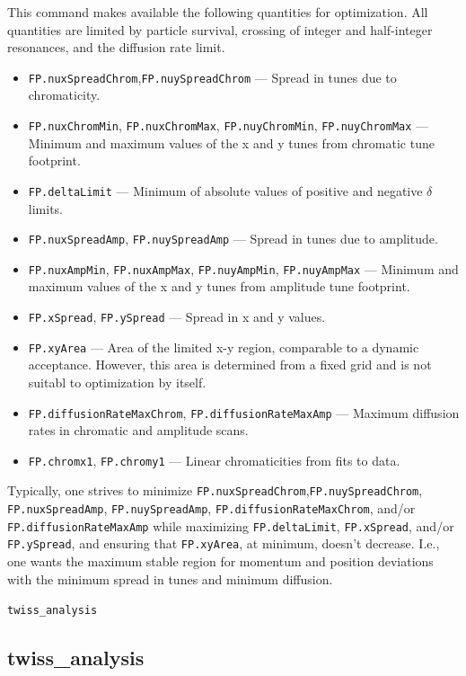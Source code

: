 \documentclass[11pt]{article}
\begin{document}
This command makes available the following quantities for optimization. All quantities are limited by 
particle survival, crossing of integer and half-integer resonances,  and the diffusion rate limit.
\begin{itemize}
\item \verb|FP.nuxSpreadChrom|,\verb|FP.nuySpreadChrom| --- Spread in tunes due to chromaticity.
\item \verb|FP.nuxChromMin|, \verb|FP.nuxChromMax|, \verb|FP.nuyChromMin|, \verb|FP.nuyChromMax| --- Minimum and maximum
  values of the x and y tunes from chromatic tune footprint.
\item \verb|FP.deltaLimit| --- Minimum of absolute values of positive and negative $\delta$ limits. 
\item \verb|FP.nuxSpreadAmp|, \verb|FP.nuySpreadAmp| --- Spread in tunes due to amplitude.
\item \verb|FP.nuxAmpMin|, \verb|FP.nuxAmpMax|, \verb|FP.nuyAmpMin|, \verb|FP.nuyAmpMax| --- Minimum and maximum
  values of the x and y tunes from amplitude tune footprint.
\item \verb|FP.xSpread|, \verb|FP.ySpread| --- Spread in x and y values.
\item \verb|FP.xyArea| --- Area of the limited x-y region, comparable to a dynamic acceptance. However, this area is determined from a
fixed grid and is not suitabl to optimization by itself.
\item \verb|FP.diffusionRateMaxChrom|, \verb|FP.diffusionRateMaxAmp| --- Maximum diffusion rates in chromatic and amplitude scans.
\item \verb|FP.chromx1|, \verb|FP.chromy1| --- Linear chromaticities from fits to data.
\end{itemize}
Typically, one strives to minimize \verb|FP.nuxSpreadChrom|,\verb|FP.nuySpreadChrom|, 
\verb|FP.nuxSpreadAmp|, \verb|FP.nuySpreadAmp|, \verb|FP.diffusionRateMaxChrom|, 
and/or \verb|FP.diffusionRateMaxAmp| 
while maximizing \verb|FP.deltaLimit|, \verb|FP.xSpread|, and/or \verb|FP.ySpread|,  and
ensuring that \verb|FP.xyArea|, at minimum, doesn't decrease.
I.e., one wants the maximum stable region for momentum and position deviations with the minimum spread in tunes and minimum diffusion.

\newpage
\begin{center}{\Large\verb|twiss_analysis|}\end{center}
\subsection{twiss\_analysis \label{subsec:twissanalysis}}
\end{document}
